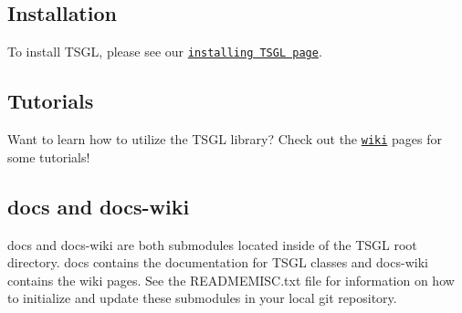  \subsection*{Installation }

To install T\+S\+GL, please see our \href{https://github.com/Calvin-CS/TSGL/wiki/Installing-TSGL}{\tt installing T\+S\+GL page}. 

 \subsection*{Tutorials }

Want to learn how to utilize the T\+S\+GL library? Check out the \href{https://github.com/Calvin-CS/TSGL/wiki}{\tt wiki} pages for some tutorials! 

 \subsection*{docs and docs-\/wiki }

docs and docs-\/wiki are both submodules located inside of the T\+S\+GL root directory. docs contains the documentation for T\+S\+GL classes and docs-\/wiki contains the wiki pages. See the R\+E\+A\+D\+M\+E\+M\+I\+S\+C.\+txt file for information on how to initialize and update these submodules in your local git repository. 